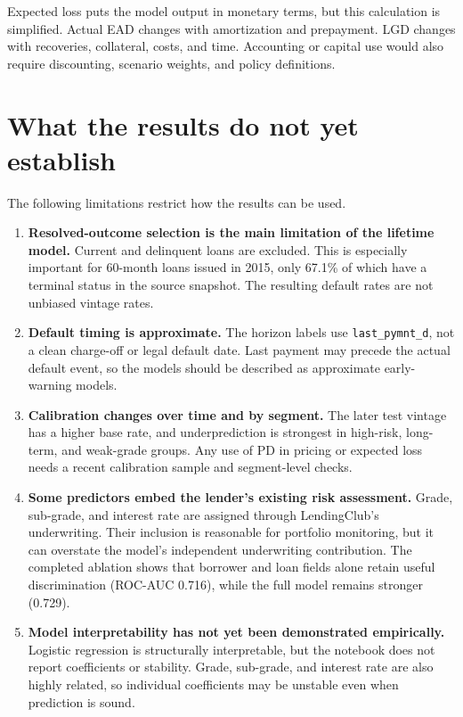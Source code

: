 \documentclass[11pt]{article}
\begin{document}
Expected loss puts the model output in monetary terms, but this calculation is
simplified. Actual EAD changes with amortization and prepayment. LGD changes with
recoveries, collateral, costs, and time. Accounting or capital use would also
require discounting, scenario weights, and policy definitions.

\section{What the results do not yet establish}

The following limitations restrict how the results can be used.

\begin{enumerate}
  \item \textbf{Resolved-outcome selection is the main limitation of the lifetime
  model.} Current and delinquent loans are excluded. This is especially important
  for 60-month loans issued in 2015, only 67.1\% of which have a terminal status in
  the source snapshot. The resulting default rates are not unbiased vintage rates.

  \item \textbf{Default timing is approximate.} The horizon labels use
  \texttt{last\_pymnt\_d}, not a clean charge-off or legal default date. Last payment
  may precede the actual default event, so the models should be described as
  approximate early-warning models.

  \item \textbf{Calibration changes over time and by segment.} The later test
  vintage has a higher base rate, and underprediction is strongest in high-risk,
  long-term, and weak-grade groups. Any use of PD in pricing or expected loss needs
  a recent calibration sample and segment-level checks.

  \item \textbf{Some predictors embed the lender's existing risk assessment.}
  Grade, sub-grade, and interest rate are assigned through LendingClub's
  underwriting. Their inclusion is reasonable for portfolio monitoring, but it
  can overstate the model's independent underwriting contribution. The completed
  ablation shows that borrower and loan fields alone retain useful discrimination
  (ROC-AUC 0.716), while the full model remains stronger (0.729).

  \item \textbf{Model interpretability has not yet been demonstrated empirically.}
  Logistic regression is structurally interpretable, but the notebook does not
  report coefficients or stability. Grade, sub-grade, and interest rate are also
  highly related, so individual coefficients may be unstable even when prediction
  is sound.


\end{enumerate}
\end{document}
